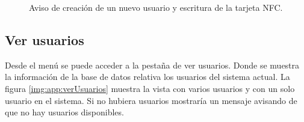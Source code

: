 \documentclass[../PFC.tex]{subfiles}
\begin{document}
\begin{figure}[H]
  \centering
  \null\hfill
  \caption{Aviso de creación de un nuevo usuario y escritura de la tarjeta NFC.}
  \label{img:app:nuevoUsuario2}
\end{figure}

\subsection{Ver usuarios}
\label{App:AD:Ver usuarios}

Desde el menú se puede acceder a la pestaña de ver usuarios. Donde se muestra la información de la base de datos relativa  los usuarios del sistema actual. La figura \ref{img:app:verUsuarios} muestra la vista con varios usuarios y con un solo usuario en el sistema. Si no hubiera usuarios mostraría un mensaje avisando de que no hay usuarios disponibles.
\end{document}
